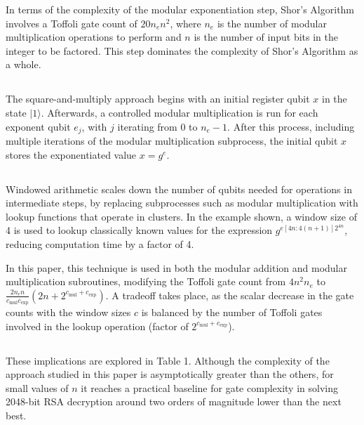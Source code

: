 \documentclass{article}
\begin{document}
In terms of the complexity of the modular exponentiation step, Shor's Algorithm involves a Toffoli gate count of $20n_en^2$, where $n_e$ is the number of modular multiplication operations to perform and $n$ is the number of input bits in the integer to be factored. This step dominates the complexity of Shor's Algorithm as a whole.

\subsection{}

The square-and-multiply approach begins with an initial register qubit $x$ in the state $|1\rangle$. Afterwards, a controlled modular multiplication is run for each exponent qubit $e_j$, with $j$ iterating from 0 to $n_e-1$. After this process, including multiple iterations of the modular multiplication subprocess, the initial qubit $x$ stores the exponentiated value $x=g^e$.

\subsection{}

Windowed arithmetic scales down the number of qubits needed for operations in intermediate steps, by replacing subprocesses such as modular multiplication with lookup functions that operate in clusters. In the example shown, a window size of 4 is used to lookup classically known values for the expression $g^{e[4n:4(n+1)]2^{4n}}$, reducing computation time by a factor of 4.

In this paper, this technique is used in both the modular addition and modular multiplication subroutines, modifying the Toffoli gate count from $4n^2n_e$ to $\frac{2n_en}{c_\text{mul}c_\text{exp}}(2n+2^{c_\text{mul}+c_\text{exp}})$. A tradeoff takes place, as the scalar decrease in the gate counts with the window sizes $c$ is balanced by the number of Toffoli gates involved in the lookup operation (factor of $2^{c_\text{mul}+c_\text{exp}}$).

\subsection{}

These implications are explored in Table 1. Although the complexity of the approach studied in this paper is asymptotically greater than the others, for small values of $n$ it reaches a practical baseline for gate complexity in solving 2048-bit RSA decryption around two orders of magnitude lower than the next best.
\end{document}
